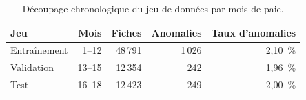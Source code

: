 \begin{table}[htbp]
\centering
\caption{Découpage chronologique du jeu de données par mois de paie.}
\label{tab:decoupage_chronologique}
\small
\begin{tabular}{lrrrr}
\toprule
\textbf{Jeu} & \textbf{Mois} & \textbf{Fiches} & \textbf{Anomalies} & \textbf{Taux d'anomalies} \\
\midrule
Entraînement & 1–12 & 48\,791 & 1\,026 & 2,10~\% \\
Validation & 13–15 & 12\,354 & 242 & 1,96~\% \\
Test & 16–18 & 12\,423 & 249 & 2,00~\% \\
\bottomrule
\end{tabular}
\end{table}
